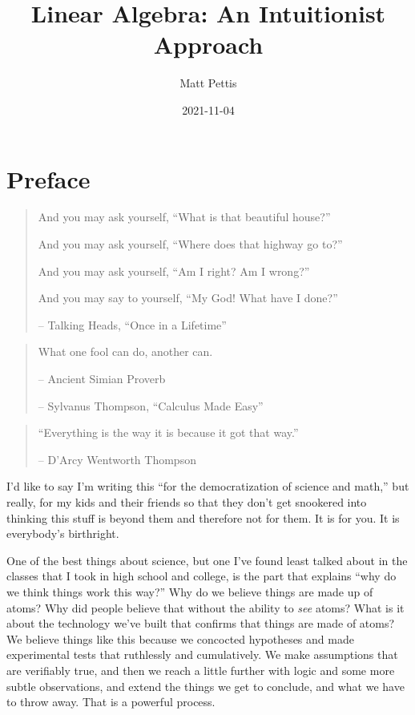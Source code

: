 \documentclass[
]{book}
\title{Linear Algebra: An Intuitionist Approach}
\author{Matt Pettis}
\date{2021-11-04}
\begin{document}
\maketitle

{
\setcounter{tocdepth}{1}
\tableofcontents
}
\hypertarget{preface}{%
\chapter{Preface}\label{preface}}

\begin{quote}
And you may ask yourself, ``What is that beautiful house?''

And you may ask yourself, ``Where does that highway go to?''

And you may ask yourself, ``Am I right? Am I wrong?''

And you may say to yourself, ``My God! What have I done?''

-- Talking Heads, ``Once in a Lifetime''
\end{quote}

\begin{quote}
What one fool can do, another can.

-- Ancient Simian Proverb

-- Sylvanus Thompson, ``Calculus Made Easy''
\end{quote}

\begin{quote}
``Everything is the way it is because it got that way.''

-- D'Arcy Wentworth Thompson
\end{quote}

I'd like to say I'm writing this ``for the democratization of science and math,'' but really, for my kids and their friends so that they don't get snookered into thinking this stuff is beyond them and therefore not for them. It is for you. It is everybody's birthright.

One of the best things about science, but one I've found least talked about in the classes that I took in high school and college, is the part that explains ``why do we think things work this way?'' Why do we believe things are made up of atoms? Why did people believe that without the ability to \emph{see} atoms? What is it about the technology we've built that confirms that things are made of atoms? We believe things like this because we concocted hypotheses and made experimental tests that ruthlessly and cumulatively. We make assumptions that are verifiably true, and then we reach a little further with logic and some more subtle observations, and extend the things we get to conclude, and what we have to throw away. That is a powerful process.
\end{document}

